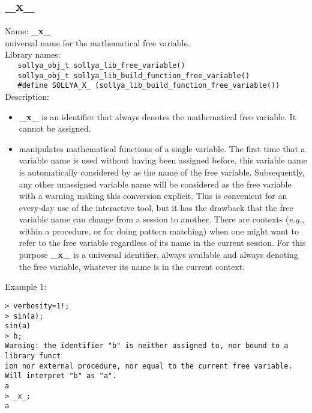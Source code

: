 \subsection{\_x\_}
\label{labxfreevariable}
\noindent Name: \textbf{\_x\_}\\
\phantom{aaa}universal name for the mathematical free variable.\\[0.2cm]
\noindent Library names:\\
\verb|   sollya_obj_t sollya_lib_free_variable()|\\
\verb|   sollya_obj_t sollya_lib_build_function_free_variable()|\\
\verb|   #define SOLLYA_X_ (sollya_lib_build_function_free_variable())|\\[0.2cm]
\noindent Description: \begin{itemize}

\item \textbf{\_x\_} is an identifier that always denotes the mathematical free variable.
   It cannot be assigned.

\item \sollya manipulates mathematical functions of a single variable. The first
   time that a variable name is used without having been assigned before, this
   variable name is automatically considered by \sollya as the name of the
   free variable. Subsequently, any other unassigned variable name will be
   considered as the free variable with a warning making this conversion
   explicit. This is convenient for an every-day use of the interactive tool,
   but it has the drawback that the free variable name can change from a
   session to another. There are contexts (\emph{e.g.}, within a procedure, or for
   doing pattern matching) when one might want to refer to the free variable
   regardless of its name in the current session. For this purpose \textbf{\_x\_} is
   a universal identifier, always available and always denoting the free
   variable, whatever its name is in the current context.
\end{itemize}
\noindent Example 1: 
\begin{center}\begin{minipage}{15cm}\begin{Verbatim}[frame=single,commandchars=\\\|\~]
> verbosity=1!;
> sin(a);
sin(a)
> b;
Warning: the identifier "b" is neither assigned to, nor bound to a library funct
ion nor external procedure, nor equal to the current free variable.
Will interpret "b" as "a".
a
> _x_;
a
\end{Verbatim}
\end{minipage}\end{center}
